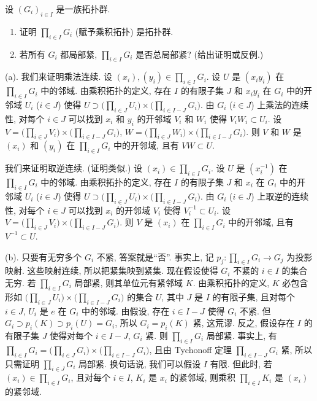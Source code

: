 \begin{exercise}[拓扑群的乘积]
\label{ex:I.5.1.2}
设 $(G_i)_{i \in I}$ 是一族拓扑群.
\begin{enumerate}
\item[(a)] 证明 $\prod_{i \in I} G_i$ (赋予乘积拓扑) 是拓扑群.
\item[(b)] 若所有 $G_i$ 都局部紧, $\prod_{i \in I} G_i$ 是否总局部紧? (给出证明或反例.)
\end{enumerate}
\end{exercise}

\begin{solution}
(a). 我们来证明乘法连续. 设 $(x_i), (y_i) \in \prod_{i \in I} G_i$. 设 $U$ 是 $(x_iy_i)$ 在 $\prod_{i \in I} G_i$ 中的邻域. 由乘积拓扑的定义, 存在 $I$ 的有限子集 $J$ 和 $x_iy_i$ 在 $G_i$ 中的开邻域 $U_i$ ($i \in J$) 使得 $U \supset \bigl(\prod_{i \in J} U_i\bigr) \times \bigl(\prod_{i \in I-J} G_i\bigr)$. 由 $G_i$ ($i \in J$) 上乘法的连续性, 对每个 $i \in J$ 可以找到 $x_i$ 和 $y_i$ 的开邻域 $V_i$ 和 $W_i$ 使得 $V_iW_i \subset U_i$. 设 $V = \bigl(\prod_{i \in J} V_i\bigr) \times \bigl(\prod_{i \in I-J} G_i\bigr)$, $W = \bigl(\prod_{i \in J} W_i\bigr) \times \bigl(\prod_{i \in I-J} G_i\bigr)$. 则 $V$ 和 $W$ 是 $(x_i)$ 和 $(y_i)$ 在 $\prod_{i \in I} G_i$ 中的开邻域, 且有 $VW \subset U$.

我们来证明取逆连续. (证明类似.) 设 $(x_i) \in \prod_{i \in I} G_i$. 设 $U$ 是 $(x_i^{-1})$ 在 $\prod_{i \in I} G_i$ 中的邻域. 由乘积拓扑的定义, 存在 $I$ 的有限子集 $J$ 和 $x_i$ 在 $G_i$ 中的开邻域 $U_i$ ($i \in J$) 使得 $U \supset \bigl(\prod_{i \in J} U_i\bigr) \times \bigl(\prod_{i \in I-J} G_i\bigr)$. 由 $G_i$ ($i \in J$) 上取逆的连续性, 对每个 $i \in J$ 可以找到 $x_i$ 的开邻域 $V_i$ 使得 $V_i^{-1} \subset U_i$. 设 $V = \bigl(\prod_{i \in J} V_i\bigr) \times \bigl(\prod_{i \in I-J} G_i\bigr)$. 则 $V$ 是 $(x_i)$ 在 $\prod_{i \in I} G_i$ 中的开邻域, 且有 $V^{-1} \subset U$.

(b). 只要有无穷多个 $G_i$ 不紧, 答案就是``否''. 事实上, 记 $p_j \colon \prod_{i \in I} G_i \to G_j$ 为投影映射. 这些映射连续, 所以把紧集映到紧集. 现在假设使得 $G_i$ 不紧的 $i \in I$ 的集合无穷. 若 $\prod_{i \in I} G_i$ 局部紧, 则其单位元有紧邻域 $K$. 由乘积拓扑的定义, $K$ 必包含形如 $\bigl(\prod_{i \in J} U_i\bigr) \times \bigl(\prod_{i \in I-J} G_i\bigr)$ 的集合 $U$, 其中 $J$ 是 $I$ 的有限子集, 且对每个 $i \in J$, $U_i$ 是 $e$ 在 $G_i$ 中的邻域. 由假设, 存在 $i \in I - J$ 使得 $G_i$ 不紧. 但 $G_i \supset p_i(K) \supset p_i(U) = G_i$, 所以 $G_i = p_i(K)$ 紧, 这荒谬.
反之, 假设存在 $I$ 的有限子集 $J$ 使得对每个 $i \in I - J$, $G_i$ 紧. 则 $\prod_{i \in I} G_i$ 局部紧. 事实上, 有 $\prod_{i \in I} G_i = \bigl(\prod_{i \in J} G_i\bigr) \times \bigl(\prod_{i \in I-J} G_i\bigr)$, 且由 Tychonoff 定理 $\prod_{i \in I-J} G_i$ 紧, 所以只需证明 $\prod_{i \in J} G_i$ 局部紧. 换句话说, 我们可以假设 $I$ 有限. 但此时, 若 $(x_i) \in \prod_{i \in I} G_i$, 且对每个 $i \in I$, $K_i$ 是 $x_i$ 的紧邻域, 则乘积 $\prod_{i \in I} K_i$ 是 $(x_i)$ 的紧邻域.
\end{solution}

